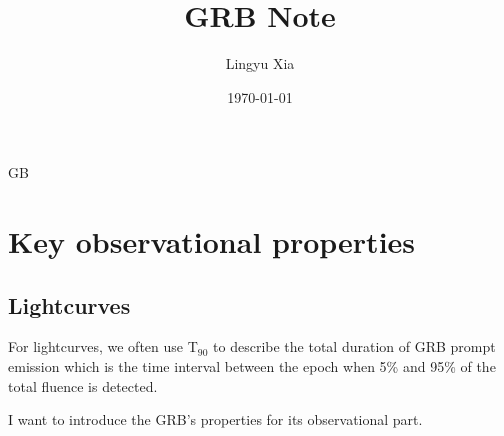 \documentclass[aps,prb,reprint]{revtex4-1}
\begin{document}
\begin{CJK*}{GB}{}
    \title{GRB Note}
    \date{\today}
    \author{Lingyu Xia}
    \maketitle
\end{CJK*}
\section{Key observational properties}

\subsection{Lightcurves}

For lightcurves, we often use T$_{90}$ to describe the total duration of GRB prompt emission which is the time interval between the epoch when 5\% and 95\% of the total fluence is detected.

I want to introduce the GRB's properties for its observational part. 
\end{document}
